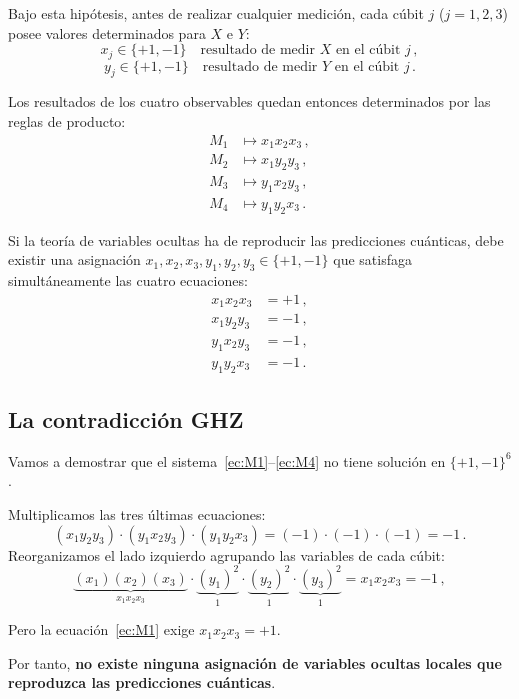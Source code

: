 \documentclass[]{unirTema}
\begin{document}
Bajo esta hipótesis, antes de realizar cualquier medición, cada cúbit $j$ ($j=1,2,3$) posee valores determinados para $X$ e $Y$:
\[
  x_j \in \{+1,-1\}\quad\text{resultado de medir }X\text{ en el cúbit }j\,,
\]
\[
  y_j \in \{+1,-1\}\quad\text{resultado de medir }Y\text{ en el cúbit }j\,.
\]

Los resultados de los cuatro observables quedan entonces determinados por las reglas de producto:
\begin{align*}
  M_1 & \mapsto x_1 x_2 x_3\,, \\
  M_2 & \mapsto x_1 y_2 y_3\,, \\
  M_3 & \mapsto y_1 x_2 y_3\,, \\
  M_4 & \mapsto y_1 y_2 x_3\,.
\end{align*}

Si la teoría de variables ocultas ha de reproducir las predicciones cuánticas, debe existir una asignación $x_1,x_2,x_3,y_1,y_2,y_3\in\{+1,-1\}$ que satisfaga simultáneamente las cuatro ecuaciones:
\begin{align}
  x_1 x_2 x_3 & = +1\,, \label{ec:M1} \\
  x_1 y_2 y_3 & = -1\,, \label{ec:M2} \\
  y_1 x_2 y_3 & = -1\,, \label{ec:M3} \\
  y_1 y_2 x_3 & = -1\,. \label{ec:M4}
\end{align}

\subsection{La contradicción GHZ}

\begin{eje}
  \label{eje:contradiccion}
  Vamos a demostrar que el sistema~\eqref{ec:M1}--\eqref{ec:M4} no tiene solución en $\{+1,-1\}^6$.

  Multiplicamos las tres últimas ecuaciones:
  \[
    (x_1 y_2 y_3)\cdot(y_1 x_2 y_3)\cdot(y_1 y_2 x_3) = (-1)\cdot(-1)\cdot(-1) = -1\,.
  \]
  Reorganizamos el lado izquierdo agrupando las variables de cada cúbit:
  \[
    \underbrace{(x_1)(x_2)(x_3)}_{x_1 x_2 x_3}
    \cdot\underbrace{(y_1)^2}_{1}\cdot\underbrace{(y_2)^2}_{1}\cdot\underbrace{(y_3)^2}_{1}
    = x_1 x_2 x_3 = -1\,,
  \]

  Pero la ecuación~\eqref{ec:M1} exige $x_1 x_2 x_3 = +1$.

  Por tanto, \textbf{no existe ninguna asignación de variables ocultas locales que reproduzca las predicciones cuánticas}.
\end{eje}
\end{document}

